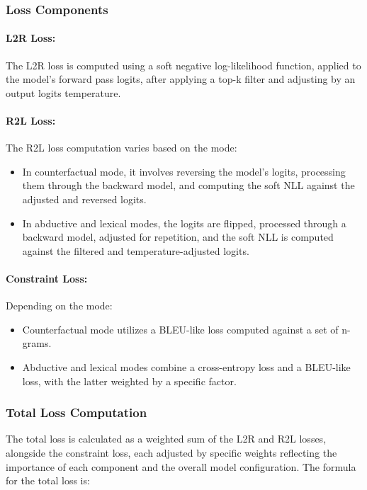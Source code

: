 \documentclass{article}
\begin{document}
\subsubsection{Loss Components}

\paragraph{L2R Loss:} The L2R loss is computed using a soft negative log-likelihood function, applied to the model's forward pass logits, after applying a top-k filter and adjusting by an output logits temperature.

\paragraph{R2L Loss:} The R2L loss computation varies based on the mode:
\begin{itemize}
    \item In counterfactual mode, it involves reversing the model's logits, processing them through the backward model, and computing the soft NLL against the adjusted and reversed logits.
    \item In abductive and lexical modes, the logits are flipped, processed through a backward model, adjusted for repetition, and the soft NLL is computed against the filtered and temperature-adjusted logits.
\end{itemize}

\paragraph{Constraint Loss:} Depending on the mode:
\begin{itemize}
    \item Counterfactual mode utilizes a BLEU-like loss computed against a set of n-grams.
    \item Abductive and lexical modes combine a cross-entropy loss and a BLEU-like loss, with the latter weighted by a specific factor.
\end{itemize}

\subsubsection{Total Loss Computation}

The total loss is calculated as a weighted sum of the L2R and R2L losses, alongside the constraint loss, each adjusted by specific weights reflecting the importance of each component and the overall model configuration. The formula for the total loss is:
\end{document}
